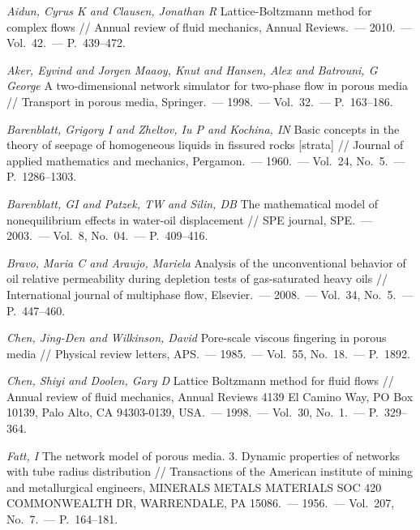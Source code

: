 \documentclass{crm-article}
\begin{document}
	\begin{thebibliography}{100}
		 \textit{Aidun, Cyrus K and Clausen, Jonathan R} Lattice-Boltzmann method for complex flows // Annual review of fluid mechanics, Annual Reviews.~--- 2010.~---  Vol.~42.~--- P.~439--472.

		 \textit{Aker, Eyvind and Jorgen Maaoy, Knut and Hansen, Alex and Batrouni, G George} A two-dimensional network simulator for two-phase flow in porous media // Transport in porous media, Springer.~--- 1998.~---  Vol.~32.~--- P.~163--186.

		 \textit{Barenblatt, Grigory I and Zheltov, Iu P and Kochina, IN} Basic concepts in the theory of seepage of homogeneous liquids in fissured rocks [strata] // Journal of applied mathematics and mechanics, Pergamon.~--- 1960.~---  Vol.~24, No.~5.~--- P.~1286--1303.

		 \textit{Barenblatt, GI and Patzek, TW and Silin, DB} The mathematical model of nonequilibrium effects in water-oil displacement // SPE journal, SPE.~--- 2003.~---  Vol.~8, No.~04.~--- P.~409--416.

		 \textit{Bravo, Maria C and Araujo, Mariela} Analysis of the unconventional behavior of oil relative permeability during depletion tests of gas-saturated heavy oils // International journal of multiphase flow, Elsevier.~--- 2008.~---  Vol.~34, No.~5.~--- P.~447--460.

		 \textit{Chen, Jing-Den and Wilkinson, David} Pore-scale viscous fingering in porous media // Physical review letters, APS.~--- 1985.~---  Vol.~55, No.~18.~--- P.~1892.

		 \textit{Chen, Shiyi and Doolen, Gary D} Lattice Boltzmann method for fluid flows // Annual review of fluid mechanics, Annual Reviews 4139 El Camino Way, PO Box 10139, Palo Alto, CA 94303-0139, USA.~--- 1998.~---  Vol.~30, No.~1.~--- P.~329--364.

		 \textit{Fatt, I} The network model of porous media. 3. Dynamic properties of networks with tube radius distribution // Transactions of the American institute of mining and metallurgical engineers, MINERALS METALS MATERIALS SOC 420 COMMONWEALTH DR, WARRENDALE, PA 15086.~--- 1956.~---  Vol.~207, No.~7.~--- P.~164--181.


\end{thebibliography}
\end{document}
